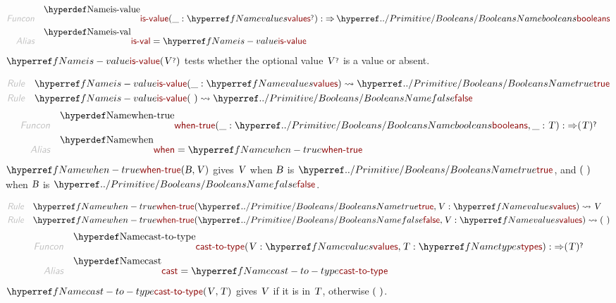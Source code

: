 \begin{align*}
  \KEY{Funcon} \quad
  & \NAMEDECL{is-value}(
                       \_ : \NAMEREF{values}\QUERY) 
    :  \TO \NAMEHYPER{../Primitive}{Booleans}{booleans} 
\\
  \KEY{Alias} \quad
  & \NAMEDECL{is-val} = \NAMEREF{is-value}
\end{align*}
$\SHADE{\NAMEREF{is-value}
           (  \VAR{V}\QUERY )}$ tests whether the optional value $\SHADE{\VAR{V}\QUERY}$ is a value or absent.

\begin{align*}
  \KEY{Rule} \quad
    & \NAMEREF{is-value}
        (  \_ : \NAMEREF{values} ) \leadsto 
        \NAMEHYPER{../Primitive}{Booleans}{true}
\\
  \KEY{Rule} \quad
    & \NAMEREF{is-value}
        (   \  ) \leadsto 
        \NAMEHYPER{../Primitive}{Booleans}{false}
\end{align*}
\begin{align*}
  \KEY{Funcon} \quad
  & \NAMEDECL{when-true}(
                       \_ : \NAMEHYPER{../Primitive}{Booleans}{booleans}, \_ : \VAR{T}) 
    :  \TO (  \VAR{T} )\QUERY 
\\
  \KEY{Alias} \quad
  & \NAMEDECL{when} = \NAMEREF{when-true}
\end{align*}
$\SHADE{\NAMEREF{when-true}
           (  \VAR{B}, 
                  \VAR{V} )}$ gives $\SHADE{\VAR{V}}$ when $\SHADE{\VAR{B}}$ is $\SHADE{\NAMEHYPER{../Primitive}{Booleans}{true}}$, and $\strut(   \  )\strut$ when $\SHADE{\VAR{B}}$ is $\SHADE{\NAMEHYPER{../Primitive}{Booleans}{false}}$.

\begin{align*}
  \KEY{Rule} \quad
    & \NAMEREF{when-true}
        (  \NAMEHYPER{../Primitive}{Booleans}{true}, 
               \VAR{V} : \NAMEREF{values} ) \leadsto 
        \VAR{V}
\\
  \KEY{Rule} \quad
    & \NAMEREF{when-true}
        (  \NAMEHYPER{../Primitive}{Booleans}{false}, 
               \VAR{V} : \NAMEREF{values} ) \leadsto 
        (   \  )
\end{align*}
\begin{align*}
  \KEY{Funcon} \quad
  & \NAMEDECL{cast-to-type}(
                       \VAR{V} : \NAMEREF{values}, \VAR{T} : \NAMEREF{types}) 
    :  \TO (  \VAR{T} )\QUERY 
\\
  \KEY{Alias} \quad
  & \NAMEDECL{cast} = \NAMEREF{cast-to-type}
\end{align*}
$\SHADE{\NAMEREF{cast-to-type}
           (  \VAR{V}, 
                  \VAR{T} )}$ gives $\SHADE{\VAR{V}}$ if it is in $\SHADE{\VAR{T}}$, otherwise $\strut(   \  )\strut$.

